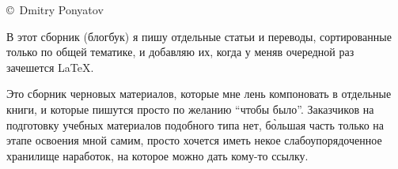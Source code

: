 
\copyright\ Dmitry Ponyatov 
\bigskip

В этот сборник (блогбук) я пишу отдельные статьи и переводы, сортированные
только по общей тематике, и добавляю их, когда у меняв очередной раз зачешется
\LaTeX.

Это сборник черновых материалов, которые мне лень компоновать в отдельные книги,
и которые пишутся просто по желанию ``чтобы было''. Заказчиков на подготовку
учебных материалов подобного типа нет, б\`{о}льшая часть только на этапе
освоения мной самим, просто хочется иметь некое слабоупорядоченное хранилище
наработок, на которое можно дать кому-то ссылку.

